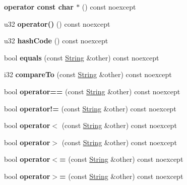 \begin{DoxyCompactItemize}
\mbox{\label{class_string_a6ce9d8ee2ecadf146944dc48b1fb292f}} 
{\bfseries operator const char $\ast$} () const noexcept
\item 
\mbox{\label{class_string_aeb704926e1c7309c55c281b2e8078830}} 
u32 {\bfseries operator()} () const noexcept
\item 
\mbox{\label{class_string_a8fd0c05e3a9ee76784cde5818b9146c7}} 
u32 {\bfseries hash\+Code} () const noexcept
\item 
\mbox{\label{class_string_a8a6813758d1896dbf09665775416800a}} 
bool {\bfseries equals} (const \mbox{\hyperlink{class_string}{String}} \&other) const noexcept
\item 
\mbox{\label{class_string_a4f5c978f41165bed85197a8c15e2c39e}} 
i32 {\bfseries compare\+To} (const \mbox{\hyperlink{class_string}{String}} \&other) const noexcept
\item 
\mbox{\label{class_string_a039a56a34f761f9fd60f0c292e739de7}} 
bool {\bfseries operator==} (const \mbox{\hyperlink{class_string}{String}} \&other) const noexcept
\item 
\mbox{\label{class_string_a7952b22541d9ea1550b03da964274fca}} 
bool {\bfseries operator!=} (const \mbox{\hyperlink{class_string}{String}} \&other) const noexcept
\item 
\mbox{\label{class_string_ad97ae77967881f018f12c1d73e10655a}} 
bool {\bfseries operator$<$} (const \mbox{\hyperlink{class_string}{String}} \&other) const noexcept
\item 
\mbox{\label{class_string_a4e553df61d67f5a74b11baab4846743f}} 
bool {\bfseries operator$>$} (const \mbox{\hyperlink{class_string}{String}} \&other) const noexcept
\item 
\mbox{\label{class_string_adb110f5512e42a8cb4562a78a41591b9}} 
bool {\bfseries operator$<$=} (const \mbox{\hyperlink{class_string}{String}} \&other) const noexcept
\item 
\mbox{\label{class_string_ab3dd8e113a19317a31d9ca91c78b6ec0}} 
bool {\bfseries operator$>$=} (const \mbox{\hyperlink{class_string}{String}} \&other) const noexcept
\end{DoxyCompactItemize}
